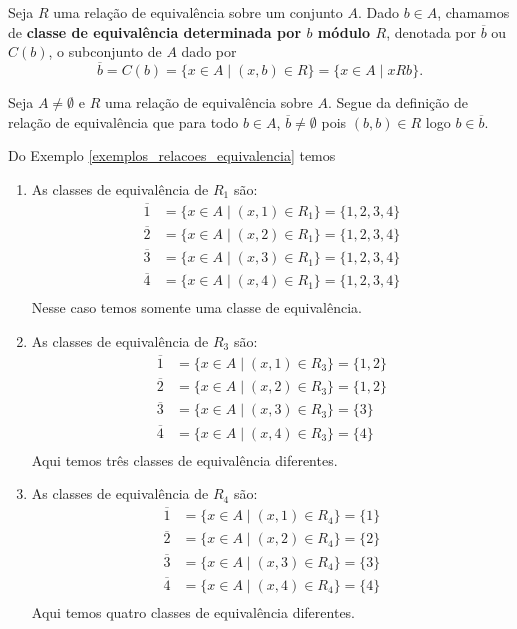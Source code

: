 \begin{definicao}
	Seja $R$ uma rela{\c c}{\~a}o de equival{\^e}ncia sobre um conjunto $A$. Dado $b \in A$, chamamos de \textbf{classe de equival{\^e}ncia determinada por $b$ m{\'o}dulo $R$}, denotada por $\overline{b}$ ou $C(b)$, o subconjunto de $A$ dado por
	\[
		\overline{b} = C(b) = \{x \in A \mid (x,b) \in R\} = \{x \in A \mid xRb\}.
	\]
\end{definicao}

\begin{observacao}
	Seja $A \ne \emptyset$ e $R$ uma relação de equivalência sobre $A$. Segue da definição de relação de equivalência que para todo $b \in A$, $\overline{b} \ne \emptyset$ pois $(b,b) \in R$ logo $b \in \overline{b}$.
\end{observacao}

\begin{exemplos}\label{exemplos_classes_equivalencia}
	Do Exemplo \ref{exemplos_relacoes_equivalencia} temos
	\begin{enumerate}
		\item As classes de equivalência de $R_1$ são:
		\begin{align*}
			\overline{1} &= \{x \in A \mid (x,1) \in R_1\} = \{1,2,3,4\}\\
			\overline{2} &= \{x \in A \mid (x,2) \in R_1\} = \{1,2,3,4\}\\
			\overline{3} &= \{x \in A \mid (x,3) \in R_1\} = \{1,2,3,4\}\\
			\overline{4} &= \{x \in A \mid (x,4) \in R_1\} = \{1,2,3,4\}\\
		\end{align*}
		Nesse caso temos somente uma classe de equivalência.

		\item As classes de equivalência de $R_3$ são:
		\begin{align*}
			\overline{1} &= \{x \in A \mid (x,1) \in R_3\} = \{1,2\}\\
			\overline{2} &= \{x \in A \mid (x,2) \in R_3\} = \{1,2\}\\
			\overline{3} &= \{x \in A \mid (x,3) \in R_3\} = \{3\}\\
			\overline{4} &= \{x \in A \mid (x,4) \in R_3\} = \{4\}\\
		\end{align*}
		Aqui temos três classes de equivalência diferentes.

		\item As classes de equivalência de $R_4$ são:
		\begin{align*}
			\overline{1} &= \{x \in A \mid (x,1) \in R_4\} = \{1\}\\
			\overline{2} &= \{x \in A \mid (x,2) \in R_4\} = \{2\}\\
			\overline{3} &= \{x \in A \mid (x,3) \in R_4\} = \{3\}\\
			\overline{4} &= \{x \in A \mid (x,4) \in R_4\} = \{4\}\\
		\end{align*}
		Aqui temos quatro classes de equivalência diferentes.


\end{enumerate}
\end{exemplos}
